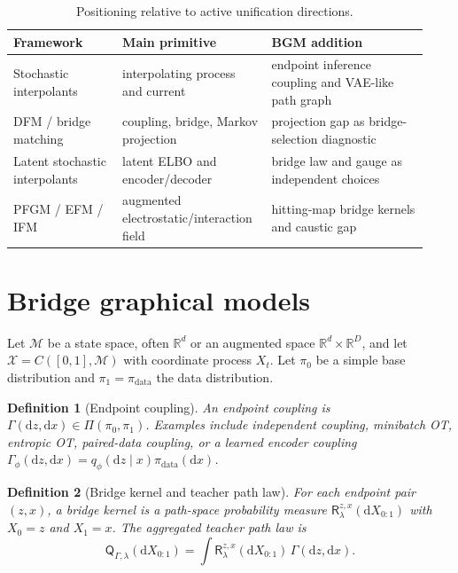 \documentclass{article}
\newtheorem{definition}{Definition}
\numberwithin{equation}{section}
\newcommand{\R}{\mathbb{R}}
\newcommand{\dd}{\mathrm{d}}
\newcommand{\Path}{\mathcal{X}}
\newcommand{\pdata}{\pi_{\mathrm{data}}}
\newcommand{\pbase}{\pi_0}
\newcommand{\ptarget}{\pi_1}
\newcommand{\scrR}{\mathsf{R}}
\newcommand{\scrQ}{\mathsf{Q}}
\begin{document}
\begin{table}[t]
\centering
\small
\caption{Positioning relative to active unification directions.}
\label{tab:positioning}
\begin{tabular}{@{}p{0.25\linewidth}p{0.32\linewidth}p{0.36\linewidth}@{}}
\toprule
Framework & Main primitive & BGM addition \\
\midrule
Stochastic interpolants & interpolating process and current & endpoint inference coupling and VAE-like path graph \\
DFM / bridge matching & coupling, bridge, Markov projection & projection gap as bridge-selection diagnostic \\
Latent stochastic interpolants & latent ELBO and encoder/decoder & bridge law and gauge as independent choices \\
PFGM / EFM / IFM & augmented electrostatic/interaction field & hitting-map bridge kernels and caustic gap \\
\bottomrule
\end{tabular}
\end{table}

\section{Bridge graphical models}
\label{sec:bgm}

Let $\mathcal M$ be a state space, often $\R^d$ or an augmented space $\R^d\times\R^D$, and let $\Path=C([0,1],\mathcal M)$ with coordinate process $X_t$. Let $\pbase$ be a simple base distribution and $\ptarget=\pdata$ the data distribution.

\begin{definition}[Endpoint coupling]
An endpoint coupling is $\Gamma(\dd z,\dd x)\in\Pi(\pbase,\ptarget)$. Examples include independent coupling, minibatch OT, entropic OT, paired-data coupling, or a learned encoder coupling $\Gamma_\phi(\dd z,\dd x)=q_\phi(\dd z\mid x)\pdata(\dd x)$.
\end{definition}

\begin{definition}[Bridge kernel and teacher path law]
For each endpoint pair $(z,x)$, a bridge kernel is a path-space probability measure $\scrR^{z,x}_\lambda(\dd X_{0:1})$ with $X_0=z$ and $X_1=x$. The aggregated teacher path law is
\begin{equation}
    \scrQ_{\Gamma,\lambda}(\dd X_{0:1})
    =\int \scrR^{z,x}_\lambda(\dd X_{0:1})\,\Gamma(\dd z,\dd x).
    \label{eq:teacher_path_law}
\end{equation}
\end{definition}
\end{document}
